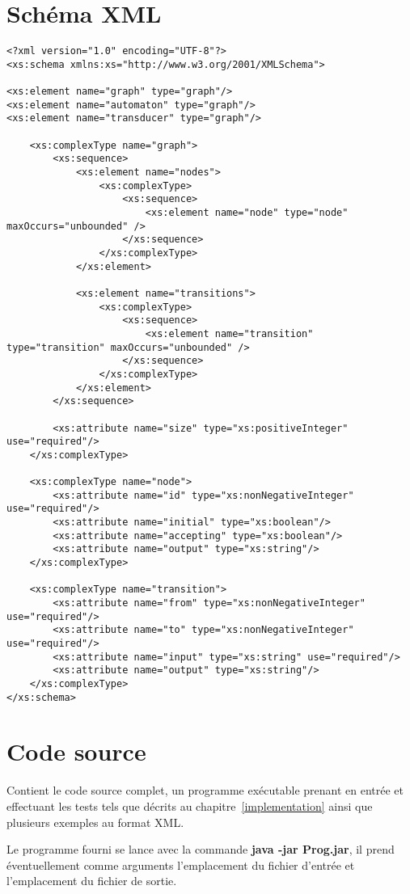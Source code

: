 \chapter{Schéma XML}
\label{schema}

	\begin{lstlisting}[caption={Schéma XML pour le format de fichier}]
<?xml version="1.0" encoding="UTF-8"?>
<xs:schema xmlns:xs="http://www.w3.org/2001/XMLSchema">

<xs:element name="graph" type="graph"/>
<xs:element name="automaton" type="graph"/>
<xs:element name="transducer" type="graph"/>

	<xs:complexType name="graph">
		<xs:sequence>
			<xs:element name="nodes">
				<xs:complexType>
					<xs:sequence>
						<xs:element name="node" type="node" maxOccurs="unbounded" />
					</xs:sequence>
				</xs:complexType>
			</xs:element>

			<xs:element name="transitions">
				<xs:complexType>
					<xs:sequence>
						<xs:element name="transition" type="transition" maxOccurs="unbounded" />
					</xs:sequence>
				</xs:complexType>
			</xs:element>
		</xs:sequence>

		<xs:attribute name="size" type="xs:positiveInteger" use="required"/>
	</xs:complexType>

	<xs:complexType name="node">
		<xs:attribute name="id" type="xs:nonNegativeInteger" use="required"/>
		<xs:attribute name="initial" type="xs:boolean"/>
		<xs:attribute name="accepting" type="xs:boolean"/>
		<xs:attribute name="output" type="xs:string"/>
	</xs:complexType>

	<xs:complexType name="transition">
		<xs:attribute name="from" type="xs:nonNegativeInteger" use="required"/>
		<xs:attribute name="to" type="xs:nonNegativeInteger" use="required"/>
		<xs:attribute name="input" type="xs:string" use="required"/>
		<xs:attribute name="output" type="xs:string"/>
	</xs:complexType>		
</xs:schema>
	\end{lstlisting}

\chapter{Code source}
\label{code}

Contient le code source complet, un programme exécutable prenant en entrée et effectuant les tests tels que décrits au chapitre~\ref{implementation} ainsi que plusieurs exemples au format XML.

Le programme fourni se lance avec la commande \textbf{java -jar Prog.jar}, il prend éventuellement comme arguments l'emplacement du fichier d'entrée et l'emplacement du fichier de sortie.